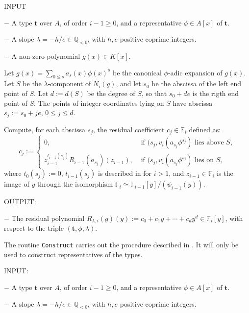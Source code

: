 \documentclass{amsart}
\begin{document}
\vskip 1mm

\noindent INPUT

\noindent $-$ A type ${\mathbf{t}}$ over $A$, of order $i-1\ge 0$, and a representative $\phi\in A[x]$ of ${\mathbf{t}}$.

\noindent $-$ A slope $\lambda=-h/e\in{\mathbb Q}_{<0}$, with $h,e$ positive coprime integers.

\noindent $-$ A non-zero polynomial $g(x)\in K[x]$.\medskip

\noindent Let $g(x)=\sum_{0\le s}a_s(x)\phi(x)^s$ be the canonical $\phi$-adic expansion of $g(x)$. Let $S$ be the $\lambda$-component of $N_i(g)$, and let $s_0$ be the abscissa of the left end point of $S$. Let $d:=d(S)$ be the degree of $S$, so that $s_0+de$ is the rigth end point of $S$. 
The points of integer coordinates lying on $S$ have abscissa  $s_j:=s_0+je$, $0\le j\le d$. 

Compute, for each abscissa $s_j$, the residual coefficient $c_j\in{\mathbb F}_i$ defined as:
$$
c_j:=\begin{cases}
0,&\mbox{ if $(s_j,v_i(a_{s_j}\phi^{s_j})$ lies above }S,\\
z_{i-1}^{t_{i-1}(s_j)}R_{i-1}(a_{s_j})(z_{i-1}),&\mbox{ if $(s_j,v_i(a_{s_j}\phi^{s_j})$ lies on }S,             
\end{cases}
$$
where $t_0(s_j):=0$, $t_{i-1}(s_j)$ is described in \cite[Def. 2.19]{HN} for $i>1$, and $z_{i-1}\in{\mathbb F}_i$ is the image of $y$ through the isomorphism ${\mathbb F}_i\simeq {\mathbb F}_{i-1}[y]/(\psi_{i-1}(y))$.\medskip

\noindent OUTPUT:

\noindent $-$ The residual polynomial $R_{\lambda,i}(g)(y):=c_0+c_1y+\cdots+c_dy^d\in {\mathbb F}_i[y]$, with respect to the triple $({\mathbf{t}},\phi,\lambda)$.\bigskip

 
The routine {\tt Construct} carries out the procedure described in \cite[Prop. 2.10]{HN}. It will only be used to construct representatives of the types. \bigskip  

\medskip

\vskip 1mm

\noindent INPUT:

\noindent $-$ A type ${\mathbf{t}}$ over $A$, of order $i-1\ge 0$, and a representative $\phi\in A[x]$ of ${\mathbf{t}}$.

\noindent $-$ A slope $\lambda=-h/e\in{\mathbb Q}_{<0}$, with $h,e$ positive coprime integers.
\end{document}
